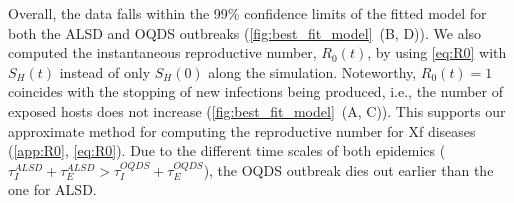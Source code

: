 Overall, the data falls within the 99\% confidence limits of the fitted
model for both the ALSD and OQDS outbreaks
(\cref{fig:best_fit_model}~\textcolor{ref_color}{(B, D)}).
We
also computed the instantaneous reproductive number, $R_0(t)$, by using
\cref{eq:R0} with $S_H(t)$ instead of only $S_H(0)$ along the simulation.
Noteworthy, $R_0(t)=1$ coincides with the stopping of new infections being
produced, i.e., the number of exposed hosts does not increase
(\cref{fig:best_fit_model}~\textcolor{ref_color}{(A, C)}). This supports our
approximate method for
computing the reproductive number for Xf diseases (\cref{app:R0},
\cref{eq:R0}). Due to the different time scales of both epidemics
($\tau_I^{ALSD}+\tau_E^{ALSD} > \tau_I^{OQDS}+\tau_E^{OQDS}$), the OQDS
outbreak dies out earlier than the one for ALSD.

\begin{table}[H]
    \centering
    \caption[Estimated parameters of the model for OQDS in Apulia]{Estimated
        epidemiological parameters from Bayesian model
        fitting to the disease progression curve of OQDS in Apulia.}
    \label{tab:parameter_estimates_OQDS}
\end{table}

